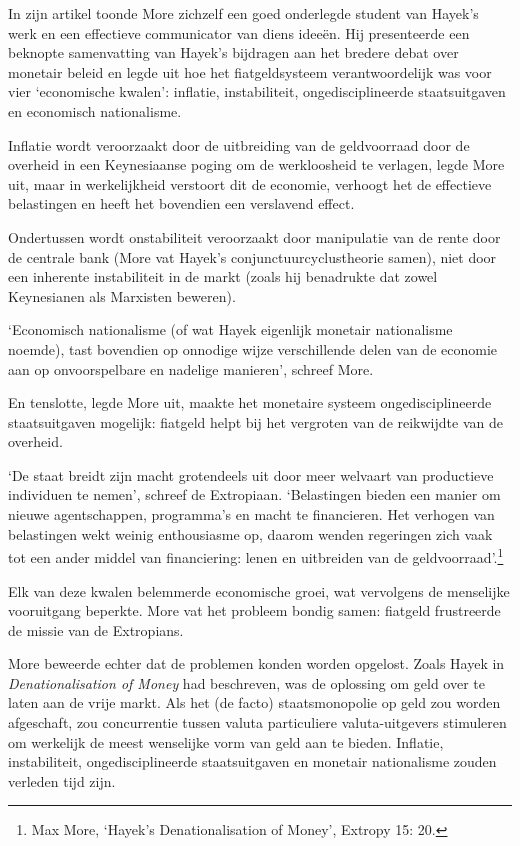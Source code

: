 \documentclass[
  a5paper,
  smalldemyvopaper,11pt,twoside,onecolumn,openright,extrafontsizes]{memoir}
\begin{document}
In zijn artikel toonde More zichzelf een goed onderlegde student van
Hayek's werk en een effectieve communicator van diens ideeën. Hij
presenteerde een beknopte samenvatting van Hayek's bijdragen aan het
bredere debat over monetair beleid en legde uit hoe het fiatgeldsysteem
verantwoordelijk was voor vier `economische kwalen': inflatie,
instabiliteit, ongedisciplineerde staatsuitgaven en economisch
nationalisme.

Inflatie wordt veroorzaakt door de uitbreiding van de geldvoorraad door
de overheid in een Keynesiaanse poging om de werkloosheid te verlagen,
legde More uit, maar in werkelijkheid verstoort dit de economie,
verhoogt het de effectieve belastingen en heeft het bovendien een
verslavend effect.

Ondertussen wordt onstabiliteit veroorzaakt door manipulatie van de
rente door de centrale bank (More vat Hayek's conjunctuurcyclustheorie
samen), niet door een inherente instabiliteit in de markt (zoals hij
benadrukte dat zowel Keynesianen als Marxisten beweren).

`Economisch nationalisme (of wat Hayek eigenlijk monetair nationalisme
noemde), tast bovendien op onnodige wijze verschillende delen van de
economie aan op onvoorspelbare en nadelige manieren', schreef More.

En tenslotte, legde More uit, maakte het monetaire systeem
ongedisciplineerde staatsuitgaven mogelijk: fiatgeld helpt bij het
vergroten van de reikwijdte van de overheid.

`De staat breidt zijn macht grotendeels uit door meer welvaart van
productieve individuen te nemen', schreef de Extropiaan. `Belastingen
bieden een manier om nieuwe agentschappen, programma's en macht te
financieren. Het verhogen van belastingen wekt weinig enthousiasme op,
daarom wenden regeringen zich vaak tot een ander middel van
financiering: lenen en uitbreiden van de geldvoorraad'.\footnote{Max
  More, `Hayek's Denationalisation of Money', Extropy 15: 20.}

Elk van deze kwalen belemmerde economische groei, wat vervolgens de
menselijke vooruitgang beperkte. More vat het probleem bondig samen:
fiatgeld frustreerde de missie van de Extropians.

More beweerde echter dat de problemen konden worden opgelost. Zoals
Hayek in \emph{Denationalisation of Money} had beschreven, was de
oplossing om geld over te laten aan de vrije markt. Als het (de facto)
staatsmonopolie op geld zou worden afgeschaft, zou concurrentie tussen
valuta particuliere valuta-uitgevers stimuleren om werkelijk de meest
wenselijke vorm van geld aan te bieden. Inflatie, instabiliteit,
ongedisciplineerde staatsuitgaven en monetair nationalisme zouden
verleden tijd zijn.
\end{document}
